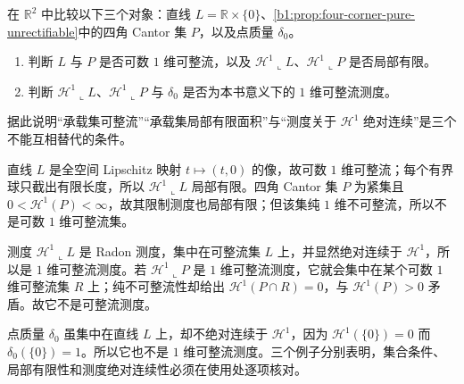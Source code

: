 \begin{exercise}\label{b1:ex:19-definition-comparisons}
在 \(\mathbb R^2\) 中比较以下三个对象：直线 \(L=\mathbb R\times\{0\}\)、\cref{b1:prop:four-corner-pure-unrectifiable}中的四角 Cantor 集 \(P\)，以及点质量 \(\delta_0\)。
\begin{enumerate}
\item 判断 \(L\) 与 \(P\) 是否可数 \(1\) 维可整流，以及 \(\mathcal H^1\llcorner L\)、\(\mathcal H^1\llcorner P\) 是否局部有限。
\item 判断 \(\mathcal H^1\llcorner L\)、\(\mathcal H^1\llcorner P\) 与 \(\delta_0\) 是否为本书意义下的 \(1\) 维可整流测度。
\end{enumerate}
据此说明“承载集可整流”“承载集局部有限面积”与“测度关于 \(\mathcal H^1\) 绝对连续”是三个不能互相替代的条件。
\end{exercise}
\begin{solution}
直线 \(L\) 是全空间 Lipschitz 映射 \(t\mapsto(t,0)\) 的像，故可数 \(1\) 维可整流；每个有界球只截出有限长度，所以 \(\mathcal H^1\llcorner L\) 局部有限。四角 Cantor 集 \(P\) 为紧集且 \(0<\mathcal H^1(P)<\infty\)，故其限制测度也局部有限；但该集纯 \(1\) 维不可整流，所以不是可数 \(1\) 维可整流集。

测度 \(\mathcal H^1\llcorner L\) 是 Radon 测度，集中在可整流集 \(L\) 上，并显然绝对连续于 \(\mathcal H^1\)，所以是 \(1\) 维可整流测度。若 \(\mathcal H^1\llcorner P\) 是 \(1\) 维可整流测度，它就会集中在某个可数 \(1\) 维可整流集 \(R\) 上；纯不可整流性却给出 \(\mathcal H^1(P\cap R)=0\)，与 \(\mathcal H^1(P)>0\) 矛盾。故它不是可整流测度。

点质量 \(\delta_0\) 虽集中在直线 \(L\) 上，却不绝对连续于 \(\mathcal H^1\)，因为 \(\mathcal H^1(\{0\})=0\) 而 \(\delta_0(\{0\})=1\)。所以它也不是 \(1\) 维可整流测度。三个例子分别表明，集合条件、局部有限性和测度绝对连续性必须在使用处逐项核对。
\end{solution}

